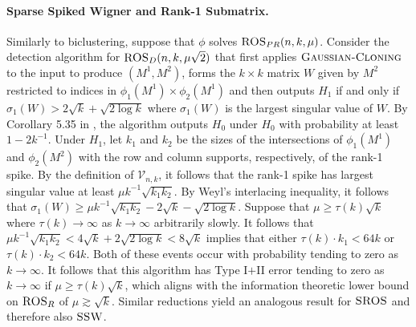 \paragraph{Sparse Spiked Wigner and Rank-1 Submatrix.} Similarly to biclustering, suppose that $\phi$ solves $\textsc{ROS}_{PR}(n, k, \mu)$. Consider the detection algorithm for $\textsc{ROS}_D(n, k, \mu \sqrt{2})$ that first applies $\textsc{Gaussian-Cloning}$ to the input to produce $(M^1, M^2)$, forms the $k \times k$ matrix $W$ given by $M^2$ restricted to indices in $\phi_1(M^1) \times \phi_2(M^1)$ and then outputs $H_1$ if and only if $\sigma_1(W) > 2\sqrt{k} + \sqrt{2 \log k}$ where $\sigma_1(W)$ is the largest singular value of $W$. By Corollary 5.35 in \cite{vershynin2010introduction}, the algorithm outputs $H_0$ under $H_0$ with probability at least $1 - 2k^{-1}$. Under $H_1$, let $k_1$ and $k_2$ be the sizes of the intersections of $\phi_1(M^1)$ and $\phi_2(M^2)$ with the row and column supports, respectively, of the rank-1 spike. By the definition of $\mathcal{V}_{n, k}$, it follows that the rank-1 spike has largest singular value at least $\mu k^{-1} \sqrt{k_1 k_2}$. By Weyl's interlacing inequality, it follows that $\sigma_1(W) \ge \mu k^{-1} \sqrt{k_1 k_2} - 2\sqrt{k} - \sqrt{2 \log k}$. Suppose that $\mu \ge \tau(k) \sqrt{k}$ where $\tau(k) \to \infty$ as $k \to \infty$ arbitrarily slowly. It follows that $\mu k^{-1} \sqrt{k_1 k_2} < 4 \sqrt{k} + 2 \sqrt{2 \log k} < 8 \sqrt{k}$ implies that either $\tau(k) \cdot k_1 < 64k$ or $\tau(k) \cdot k_2 < 64k$. Both of these events occur with probability tending to zero as $k \to \infty$. It follows that this algorithm has Type I$+$II error tending to zero as $k \to \infty$ if $\mu \ge \tau(k) \sqrt{k}$, which aligns with the information theoretic lower bound on $\textsc{ROS}_R$ of $\mu \gtrsim \sqrt{k}$. Similar reductions yield an analogous result for $\textsc{SROS}$ and therefore also $\textsc{SSW}$.

